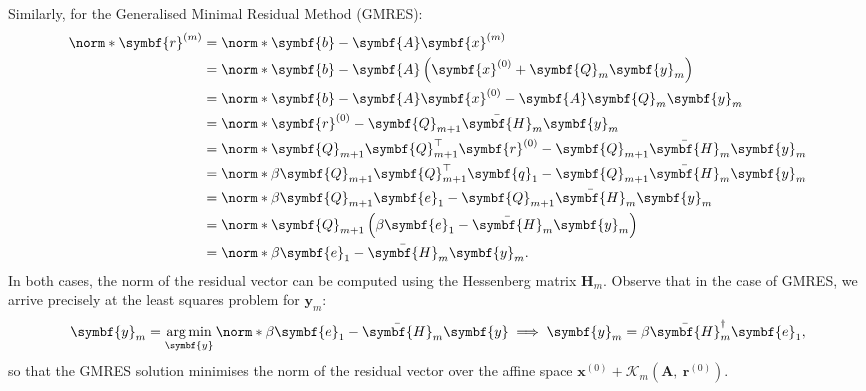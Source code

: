 \documentclass{article}
\DeclareMathOperator{\argmin}{arg\, min}
\begin{document}
Similarly, for the Generalised Minimal Residual Method (GMRES):
\begin{align*}
    \norm*{\symbf{r}^{\left( m \right)}} & = \norm*{\symbf{b} - \symbf{A} \symbf{x}^{\left( m \right)}}                                                                \\
                                         & = \norm*{\symbf{b} - \symbf{A} \left( \symbf{x}^{\left( 0 \right)} + \symbf{Q}_m \symbf{y}_m \right)}                       \\
                                         & = \norm*{\symbf{b} - \symbf{A} \symbf{x}^{\left( 0 \right)} - \symbf{A} \symbf{Q}_m \symbf{y}_m}                            \\
                                         & = \norm*{\symbf{r}^{\left( 0 \right)} - \symbf{Q}_{m+1} \bar{\symbf{H}}_m \symbf{y}_m}                                      \\
                                         & = \norm*{\symbf{Q}_{m+1} \symbf{Q}_{m+1}^\top \symbf{r}^{\left( 0 \right)} - \symbf{Q}_{m+1} \bar{\symbf{H}}_m \symbf{y}_m} \\
                                         & = \norm*{\beta \symbf{Q}_{m+1} \symbf{Q}_{m+1}^\top \symbf{q}_1 - \symbf{Q}_{m+1} \bar{\symbf{H}}_m \symbf{y}_m}            \\
                                         & = \norm*{\beta \symbf{Q}_{m+1} \symbf{e}_1 - \symbf{Q}_{m+1} \bar{\symbf{H}}_m \symbf{y}_m}                                 \\
                                         & = \norm*{\symbf{Q}_{m+1} \left( \beta \symbf{e}_1 - \bar{\symbf{H}}_m \symbf{y}_m \right)}                                  \\
                                         & = \norm*{\beta \symbf{e}_1 - \bar{\symbf{H}}_m \symbf{y}_m}.
\end{align*}
In both cases, the norm of the residual vector can be computed using
the Hessenberg matrix \(\symbf{H}_m\).
Observe that in the case of GMRES, we arrive precisely at the least
squares problem for \(\symbf{y}_m\):
\begin{equation*}
    \symbf{y}_m = \argmin_{\symbf{y}} \norm*{\beta \symbf{e}_1 - \bar{\symbf{H}}_m \symbf{y}} \implies \symbf{y}_m = \beta \bar{\symbf{H}}_m^\dagger \symbf{e}_1,
\end{equation*}
so that the GMRES solution minimises the norm of the residual vector
over the affine space \(\symbf{x}^{\left( 0 \right)} + \mathcal{K}_m\left( \symbf{A},\: \symbf{r}^{\left( 0 \right)} \right)\).
\end{document}
